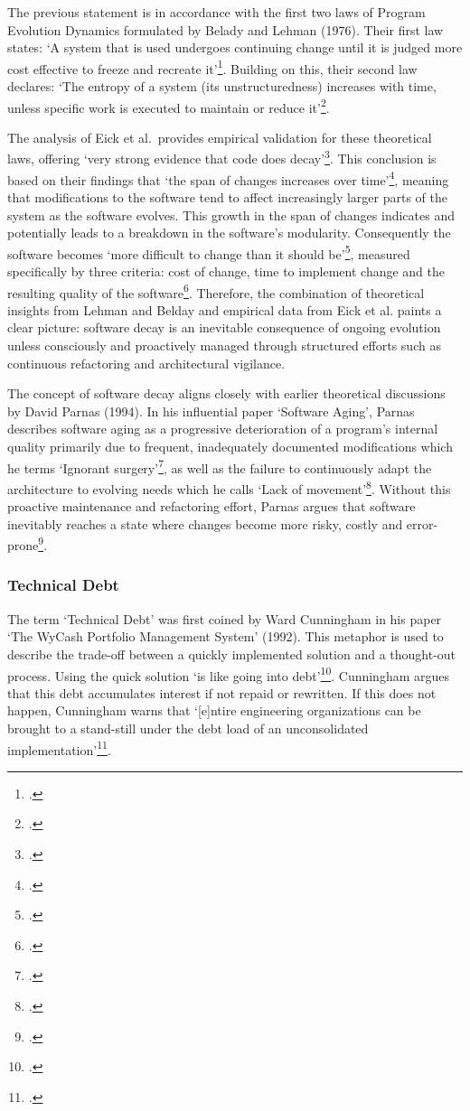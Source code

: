 The previous statement is in accordance with the first two laws of Program Evolution Dynamics formulated by Belady and Lehman (1976).
Their first law states: `A system that is used undergoes continuing change until it is judged more cost effective to freeze and recreate it'\footcite[228]{beladyModelLargeProgram1976}.
Building on this, their second law declares: `The entropy of a system (its unstructuredness) increases with time, unless specific work is executed to maintain or reduce it'\footcite[228]{beladyModelLargeProgram1976}.

The analysis of Eick et al.\ provides empirical validation for these theoretical laws, offering `very strong evidence that code does decay'\footcite[7]{eickDoesCodeDecay2001}.
This conclusion is based on their findings that `the span of changes increases over time'\footcite[7]{eickDoesCodeDecay2001}, meaning that modifications to the software tend to affect increasingly larger parts of the system as the software evolves. This growth in the span of changes indicates and potentially leads to
a breakdown in the software's modularity. Consequently the software becomes `more difficult to change than it should be'\footcite[3]{eickDoesCodeDecay2001}, measured specifically by three criteria: cost of change, time to implement change and the resulting quality of the software\footcite[3]{eickDoesCodeDecay2001}.
Therefore, the combination of theoretical insights from Lehman and Belday and empirical data from Eick et al. paints a clear picture: software decay is an inevitable consequence of ongoing evolution unless consciously and proactively managed through structured efforts such as continuous refactoring and architectural vigilance.

The concept of software decay aligns closely with earlier theoretical discussions by David Parnas (1994). In his influential paper `Software Aging', Parnas describes software aging as a progressive deterioration of a program's internal quality primarily due to frequent, 
inadequately documented modifications which he terms `Ignorant surgery'\footcite[280]{296790}, as well as the failure to continuously adapt the architecture to evolving needs which he calls `Lack of movement'\footcite[280]{296790}.
Without this proactive maintenance and refactoring effort, Parnas argues that software inevitably reaches a state where changes become more risky, costly and error-prone\footcite[280-281]{296790}.

\subsubsection{Technical Debt}
The term `Technical Debt' was first coined by Ward Cunningham in his paper `The WyCash Portfolio Management System' (1992). This metaphor is used to describe the trade-off between a quickly implemented solution and a thought-out process. 
Using the quick solution `is like going into debt'\footcite[2]{cunninghamWyCashPortfolioManagement1992}. Cunningham argues that this debt accumulates interest if not repaid or rewritten. 
If this does not happen, Cunningham warns that `[e]ntire engineering organizations can be brought to a stand-still under the debt load of an unconsolidated implementation'\footcite[2]{cunninghamWyCashPortfolioManagement1992}.

